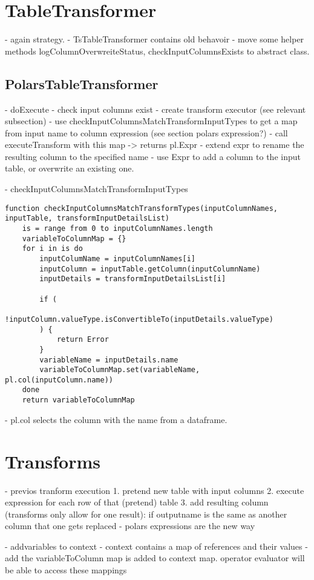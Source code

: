\section{TableTransformer}
- again strategy.
- TsTableTransformer contains old behavoir
- move some helper methods logColumnOverwreiteStatus, checkInputColumnsExists to abstract class.

\subsection{PolarsTableTransformer}
- doExecute
- check input columns exist
- create transform executor (see relevant subsection)
- use checkInputColumnsMatchTransformInputTypes to get a map from input name to column expression (see section polars expression?)
- call executeTransform with this map -> returns pl.Expr
- extend expr to rename the resulting column to the specified name
- use Expr to add a column to the input table, or overwrite an existing one.


- checkInputColumnsMatchTransformInputTypes
\begin{listing}
	\begin{verbatim}
function checkInputColumnsMatchTransformTypes(inputColumnNames, inputTable, transformInputDetailsList)
	is = range from 0 to inputColumnNames.length
	variableToColumnMap = {}
	for i in is do
		inputColumName = inputColumnNames[i]
		inputColumn = inputTable.getColumn(inputColumnName)
		inputDetails = transformInputDetailsList[i]

		if (
			!inputColumn.valueType.isConvertibleTo(inputDetails.valueType)
		) {
			return Error
		}
		variableName = inputDetails.name
		variableToColumnMap.set(variableName, pl.col(inputColumn.name))
	done
	return variableToColumnMap
	\end{verbatim}
\end{listing}
- pl.col selects the column with the name from a dataframe.


\section{Transforms}
\label{section:impl:transforms}
- previos tranform execution
1. pretend new table with input columns
2. execute expression for each row of that (pretend) table
3. add resulting column (transforms only allow for one result): if outputname is the same as another column that one gets replaced
- polars expressions are the new way

- addvariables to context
- context contains a map of references and their values
- add the variableToColumn map is added to context map. operator evaluator will be able to access these mappings

